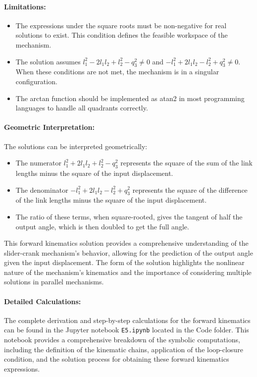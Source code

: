 \begin{solution}
\paragraph{Limitations:}
\begin{itemize}
    \item The expressions under the square roots must be non-negative for real solutions to exist. This condition defines the feasible workspace of the mechanism.
    \item The solution assumes $l_1^2 - 2l_1l_2 + l_2^2 - q_3^2 \neq 0$ and $-l_1^2 + 2l_1l_2 - l_2^2 + q_3^2 \neq 0$. When these conditions are not met, the mechanism is in a singular configuration.
    \item The arctan function should be implemented as atan2 in most programming languages to handle all quadrants correctly.
\end{itemize}

\paragraph{Geometric Interpretation:}
The solutions can be interpreted geometrically:
\begin{itemize}
    \item The numerator $l_1^2 + 2l_1l_2 + l_2^2 - q_3^2$ represents the square of the sum of the link lengths minus the square of the input displacement.
    \item The denominator $-l_1^2 + 2l_1l_2 - l_2^2 + q_3^2$ represents the square of the difference of the link lengths minus the square of the input displacement.
    \item The ratio of these terms, when square-rooted, gives the tangent of half the output angle, which is then doubled to get the full angle.
\end{itemize}

This forward kinematics solution provides a comprehensive understanding of the slider-crank mechanism's behavior, allowing for the prediction of the output angle given the input displacement. The form of the solution highlights the nonlinear nature of the mechanism's kinematics and the importance of considering multiple solutions in parallel mechanisms.

\paragraph{Detailed Calculations:} The complete derivation and step-by-step calculations for the forward kinematics can be found in the Jupyter notebook \texttt{E5.ipynb} located in the Code folder. This notebook provides a comprehensive breakdown of the symbolic computations, including the definition of the kinematic chains, application of the loop-closure condition, and the solution process for obtaining these forward kinematics expressions.
    

\end{solution}
